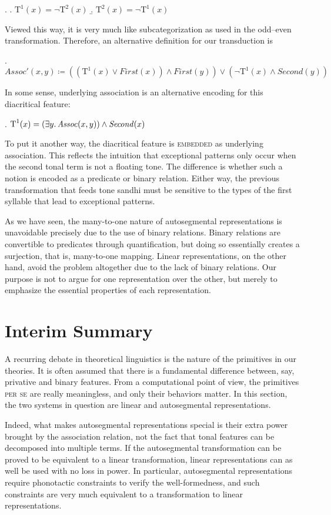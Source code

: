 \documentclass[12pt, a4paper]{report}
\newcommand{\textemph}[1]{\textsc{#1}}
\begin{document}
\ex.
\a. \(\text{T}^{1}(x) = \neg\text{T}^{2}(x)\)
\b. \(\text{T}^{2}(x) = \neg\text{T}^{1}(x)\)

Viewed this way, it is very much like subcategorization as used in the
odd--even transformation.  Therefore, an alternative definition for
our transduction is

\ex. \(\mathit{Assoc}'(x, y) \coloneq
((\text{T}^{1}(x) \lor \mathit{First}(x))
\land \mathit{First}(y)) \lor
(\neg\text{T}^{1}(x) \land \mathit{Second}(y))\)

In some sense, underlying association is an alternative encoding for
this diacritical feature:

\ex. \(\text{T}^{1}(x) = (\exists y\ldotp \mathit{Assoc}(x, y)) \land
\mathit{Second}(x)\)

To put it another way, the diacritical feature is \textemph{embedded}
as underlying association.  This reflects the intuition that
exceptional patterns only occur when the second tonal term is not a
floating tone.  The difference is whether such a notion is encoded as
a predicate or binary relation.  Either way, the previous
transformation that feeds tone sandhi must be sensitive to the types
of the first syllable that lead to exceptional patterns.

As we have seen, the many-to-one nature of autosegmental
representations is unavoidable precisely due to the use of binary
relations.  Binary relations are convertible to predicates through
quantification, but doing so essentially creates a surjection, that
is, many-to-one mapping.  Linear representations, on the other hand,
avoid the problem altogether due to the lack of binary relations.  Our
purpose is not to argue for one representation over the other, but
merely to emphasize the essential properties of each representation.

\section{Interim Summary}
A recurring debate in theoretical linguistics is the nature of the
primitives in our theories.  It is often assumed that there is a
fundamental difference between, say, privative and binary features.
From a computational point of view, the primitives \textemph{per se}
are really meaningless, and only their behaviors matter.  In this
section, the two systems in question are linear and autosegmental
representations.

Indeed, what makes autosegmental representations special is their
extra power brought by the association relation, not the fact that
tonal features can be decomposed into multiple terms.  If the
autosegmental transformation can be proved to be equivalent to a
linear transformation, linear representations can as well be used with
no loss in power.  In particular, autosegmental representations
require phonotactic constraints to verify the well-formedness, and
such constraints are very much equivalent to a transformation to
linear representations.
\end{document}
